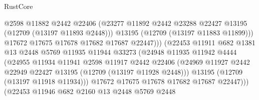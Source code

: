 \begin{lexlean}{RustCore}
\begin{coremodule}
                                    @2598
                                    @11882
                                    @2442
                                    @22406
                                    (@23277
                                      @11892
                                      @2442
                                      @23288
                                      @22427
                                      @13195
                                      (@12709 (@13197 @11893 @2448)))
                                    @13195
                                    (@12709 (@13197 @11883 @11899)))
                                  @17672
                                  @17675
                                  @17678
                                  @17682
                                  @17687
                                  @22447)))
                            (@22453
                              @11911
                              @682
                              @1381
                              @13
                              @2448
                              @5769
                              @11935
                              @11944
                              @33273
                              (@24948
                                @11935
                                @11942
                                @4444
                                (@24955
                                  @11934
                                  @11941
                                  @2598
                                  @11917
                                  @2442
                                  @22406
                                  (@24969
                                    @11927
                                    @2442
                                    @22949
                                    @22427
                                    @13195
                                    (@12709 (@13197 @11928 @2448)))
                                  @13195
                                  (@12709 (@13197 @11918 @11934)))
                                @17672
                                @17675
                                @17678
                                @17682
                                @17687
                                @22447)))
                          (@22453
                            @11946
                            @682
                            @2160
                            @13
                            @2448
                            @5769
                            @2448

\end{coremodule}
\end{lexlean}
